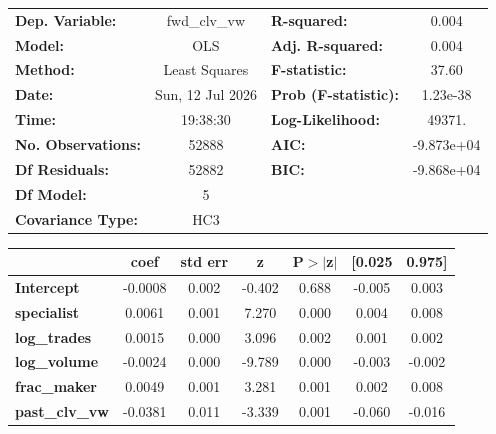 \begin{center}
\begin{tabular}{lclc}
\toprule
\textbf{Dep. Variable:}    &   fwd\_clv\_vw   & \textbf{  R-squared:         } &     0.004   \\
\textbf{Model:}            &       OLS        & \textbf{  Adj. R-squared:    } &     0.004   \\
\textbf{Method:}           &  Least Squares   & \textbf{  F-statistic:       } &     37.60   \\
\textbf{Date:}             & Sun, 12 Jul 2026 & \textbf{  Prob (F-statistic):} &  1.23e-38   \\
\textbf{Time:}             &     19:38:30     & \textbf{  Log-Likelihood:    } &    49371.   \\
\textbf{No. Observations:} &       52888      & \textbf{  AIC:               } & -9.873e+04  \\
\textbf{Df Residuals:}     &       52882      & \textbf{  BIC:               } & -9.868e+04  \\
\textbf{Df Model:}         &           5      & \textbf{                     } &             \\
\textbf{Covariance Type:}  &       HC3        & \textbf{                     } &             \\
\bottomrule
\end{tabular}
\begin{tabular}{lcccccc}
                       & \textbf{coef} & \textbf{std err} & \textbf{z} & \textbf{P$> |$z$|$} & \textbf{[0.025} & \textbf{0.975]}  \\
\midrule
\textbf{Intercept}     &      -0.0008  &        0.002     &    -0.402  &         0.688        &       -0.005    &        0.003     \\
\textbf{specialist}    &       0.0061  &        0.001     &     7.270  &         0.000        &        0.004    &        0.008     \\
\textbf{log\_trades}   &       0.0015  &        0.000     &     3.096  &         0.002        &        0.001    &        0.002     \\
\textbf{log\_volume}   &      -0.0024  &        0.000     &    -9.789  &         0.000        &       -0.003    &       -0.002     \\
\textbf{frac\_maker}   &       0.0049  &        0.001     &     3.281  &         0.001        &        0.002    &        0.008     \\
\textbf{past\_clv\_vw} &      -0.0381  &        0.011     &    -3.339  &         0.001        &       -0.060    &       -0.016     \\

\end{tabular}
\end{center}

